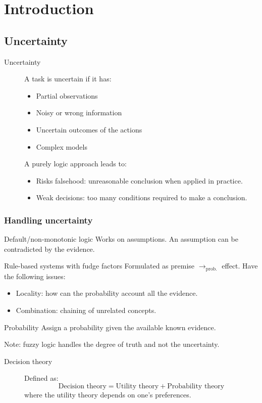 \chapter{Introduction}


\section{Uncertainty}
\begin{description}
    \item[Uncertainty] 
        A task is uncertain if it has:
        \begin{itemize}
            \item Partial observations
            \item Noisy or wrong information
            \item Uncertain outcomes of the actions
            \item Complex models
        \end{itemize}

        A purely logic approach leads to:
        \begin{itemize}
            \item Risks falsehood: unreasonable conclusion when applied in practice.
            \item Weak decisions: too many conditions required to make a conclusion.
        \end{itemize}
\end{description}


\subsection{Handling uncertainty}
\begin{descriptionlist}
    \item[Default/non-monotonic logic] 
        Works on assumptions.
        An assumption can be contradicted by the evidence.

    \item[Rule-based systems with fudge factors] 
        Formulated as premise $\rightarrow_\text{prob.}$ effect.
        Have the following issues:
        \begin{itemize}
            \item Locality: how can the probability account all the evidence.
            \item Combination: chaining of unrelated concepts.
        \end{itemize}

    \item[Probability] 
        Assign a probability given the available known evidence.

        Note: fuzzy logic handles the degree of truth and not the uncertainty.
\end{descriptionlist}

\begin{description}
    \item[Decision theory] 
        Defined as:
        \[ \text{Decision theory} = \text{Utility theory} + \text{Probability theory} \]
        where the utility theory depends on one's preferences.
\end{description}